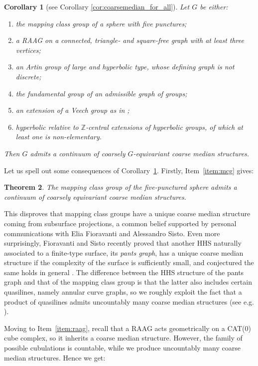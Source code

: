 \documentclass[svgnames]{amsart}
\theoremstyle{plain}
\newtheorem{thmintro}{Theorem}
\newtheorem{corintro}[thmintro]{Corollary}
\theoremstyle{definition}
\newcommand{\Z}{\mathbb{Z}}
\begin{document}
\begin{corintro}[see Corollary \ref{cor:coarsemedian_for_all}]\label{corintro_med}
    Let $G$ be either:
    \begin{enumerate}[label=(\alph*)]
        \item\label{item:mcg} the mapping class group of a sphere with five punctures;
        \item \label{item:raag} a RAAG on a connected, triangle- and square-free graph with at least three vertices;
        \item \label{item:eltag} an Artin group of large and hyperbolic type, whose defining graph is not discrete;
        \item the fundamental group of an admissible graph of groups;
        \item an extension of a Veech group as in \cite{veech,bongiovanni2024extensions};
        \item hyperbolic relative to $\Z$-central extensions of hyperbolic groups, of which at least one is non-elementary.
        \end{enumerate}
    Then $G$ admits a continuum of coarsely $G$-equivariant coarse median structures.
\end{corintro}

Let us spell out some consequences of Corollary~\ref{corintro_med}. Firstly, Item~\ref{item:mcg} gives:
\begin{thmintro}\label{thmintro_mcg}
    The mapping class group of the five-punctured sphere admits a continuum of coarsely equivariant coarse median structures.
\end{thmintro}
This disproves that mapping class groups have a unique coarse median structure coming from subsurface projections, a common belief supported by personal communications with Elia Fioravanti and Alessandro Sisto. Even more surprisingly, Fioravanti and Sisto recently proved that another HHS naturally associated to a finite-type surface, its \emph{pants graph}, has a unique coarse median structure if the complexity of the surface is sufficiently small, and conjectured the same holds in general \cite{FS_pantsgraph}. The difference between the HHS structure of the pants graph and that of the mapping class group is that the latter also includes certain quasilines, namely annular curve graphs, so we roughly exploit the fact that a product of quasilines admits uncountably many coarse median structures (see e.g. \cite[Remark 4.8]{FS_pantsgraph}).

\par\medskip
Moving to Item~\ref{item:raag}, recall that a RAAG acts geometrically on a CAT(0) cube complex, so it inherits a coarse median structure. However, the family of possible cubulations is countable, while we produce uncountably many coarse median structures. Hence we get:
\end{document}
